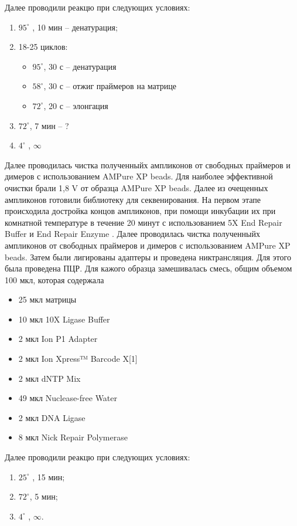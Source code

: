 Далее проводили реакцю при следующих условиях:

\begin{enumerate}
	\item $95^{\circ}$ , 10 мин – денатурация;
	\item 18-25 циклов:
	\begin{itemize}
		\item $95^{\circ}$, 30 с – денатурация
		\item $58^{\circ}$, 30 с – отжиг праймеров на матрице
		\item $72^{\circ}$, 20 с – элонгация
	\end{itemize}
	\item $72^{\circ}$, 7 мин – ?
	\item $4^{\circ}$ ,  $\infty$
\end{enumerate}

Далее проводилась чистка полученныйх ампликонов от свободных праймеров и димеров с использованием AMPure XP beads.  Для наиболее эффективной очистки брали  1,8 V от образца AMPure XP beads. Далее из очещенных ампликонов готовили библиотеку для секвенирования. 
На первом этапе происходила достройка концов ампликонов, при помощи инкубации их при комнатной температуре в течение 20 минут с использованием 5X End Repair Buffer и End Repair Enzyme . Далее проводилась чистка полученныйх ампликонов от свободных праймеров и димеров с использованием AMPure XP beads. Затем были лигированы адаптеры и проведена никтрансляция. Для этого была проведена ПЦР. Для кажого образца замешивалась смесь, общим объемом 100 мкл, которая содержала 

\begin{itemize}
\item 25 мкл матрицы
\item 10 мкл 10X Ligase Buffer
\item 2 мкл Ion P1 Adapter
\item 2 мкл Ion Xpress™ Barcode X[1] 
\item 2 мкл dNTP Mix
\item 49 мкл Nuclease-free Water
\item 2 мкл DNA Ligase
\item 8 мкл Nick Repair Polymerase
\end{itemize}

Далее проводили реакцю при следующих условиях:

\begin{enumerate}
	\item $25^{\circ}$ , 15 мин;
	\item $72^{\circ}$, 5 мин;
	\item $4^{\circ}$ ,  $\infty$.
\end{enumerate}

